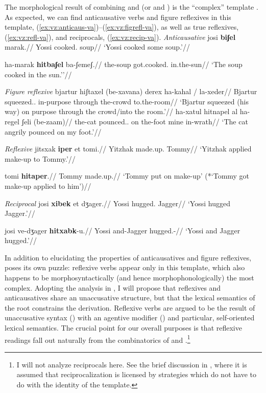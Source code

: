 {The morphological result of combining {\pz} and {\va} (or {\pz} and {\va}) is the ``complex'' template {\thit}. As expected, we can find anticausative verbs and figure reflexives in this template, (\ref{ex:vz:anticaus-va})--(\ref{ex:vz:figrefl-va}), as well as true reflexives, (\ref{ex:vz:refl-va}), and reciprocals, (\ref{ex:vz:recip-va}).
\pex\label{ex:vz:anticaus-va}\textit{Anticausative}
	\a \begingl
		\gla josi \textbf{biʃel} marak.//
		\glb Yossi cooked. soup//
		\glft `Yossi cooked some soup.'//
	\endgl
	
	\a \begingl
		\gla ha-marak \textbf{hitbaʃel} ba-ʃemeʃ.//
		\glb the-soup got.cooked. in.the-sun//
		\glft `The soup cooked in the sun.''//
	\endgl
\xe

\pex\label{ex:vz:figrefl-va}\textit{Figure reflexive}
	\a \begingl
		\gla bjartur hiʃtaxel (be-xavana) derex ha-kahal / la-xeder//
		\glb Bjartur squeezed.. in-purpose through the-crowd {} to.the-room//
		\glft `Bjartur squeezed (his way) on purpose through the crowd/into the room.'//
		\endgl
	\a \begingl
		\gla ha-xatul hitnapel al ha-regel ʃeli (be-zaam)//
		\glb the-cat pounced.. on the-foot mine in-wrath//
		\glft `The cat angrily pounced on my foot.'//
		\endgl
\xe

\pex\label{ex:vz:refl-va}\textit{Reflexive}
	\a \begingl
		\gla jitsxak \textbf{iper} et tomi.//
		\glb Yitzhak made.up.  Tommy//
		\glft `Yitzhak applied make-up to Tommy.'//
	\endgl
	
	\a \begingl
		\gla tomi \textbf{hitaper}.//
		\glb Tommy made.up.//
		\glft `Tommy put on make-up' (*`Tommy got make-up applied to him')//
	\endgl
\xe

\pex\label{ex:vz:recip-va}\textit{Reciprocal}
	\a \begingl
		\gla josi \textbf{xibek} et dʒager.//
		\glb Yossi hugged.  Jagger//
		\glft `Yossi hugged Jagger.'//
	\endgl
	
	\a \begingl
		\gla josi ve-{dʒ}ager \textbf{hitxabk}-u.//
		\glb Yossi and-Jagger hugged.-//
		\glft `Yossi and Jagger hugged.'//
	\endgl
\xe

In addition to elucidating the properties of anticausatives and figure reflexives, {\thit} poses its own puzzle: reflexive verbs appear only in this template, which also happens to be morphosyntactically (and hence morphophonologically) the most complex. Adopting the analysis in \cite{kastner17gjgl}, I will propose that reflexives and anticausatives share an unaccusative structure, but that the lexical semantics of the root constrains the derivation. Reflexive verbs are argued to be the result of unaccusative syntax (\vz) with an agentive modifier (\va) and particular, self-oriented lexical semantics. The crucial point for our overall purposes is that reflexive readings fall out naturally from the combinatorics of {\vz} and {\va}.\footnote{I will not analyze reciprocals here. See the brief discussion in \citet[20]{kastner17gjgl}, where it is assumed that reciprocalization is licensed by strategies which do not have to do with the identity of the template.}


}
